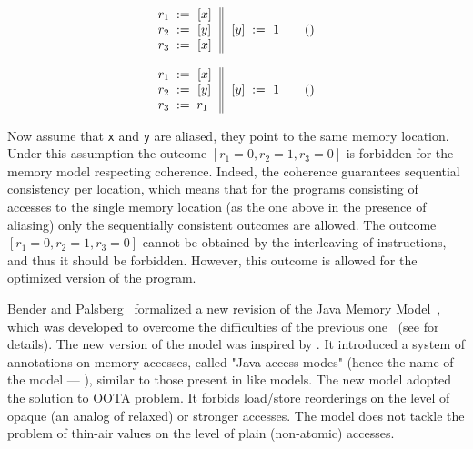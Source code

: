 \begin{minipage}{0.5\linewidth}
\begin{equation*}
\inarrII{
  \readInst{}{r_1}{x}      \\
  \readInst{}{r_2}{y}      \\
  \readInst{}{r_3}{x}      \\
}{
  \writeInst{}{y}{1}       \\
}
\tag{}\label{ex:coh-rr}
\end{equation*}
\end{minipage}
%
\begin{minipage}{0.5\linewidth}
\begin{equation*}
\inarrII{
  \readInst{}{r_1}{x}      \\
  \readInst{}{r_2}{y}      \\
  \assignInst{r_3}{r_1}    \\
}{
  \writeInst{}{y}{1}       \\
}
\tag{}\label{ex:coh-rr}
\end{equation*}
\end{minipage}

Now assume that \texttt{x} and \texttt{y} are aliased,
\ie they point to the same memory location.
Under this assumption the outcome $[r_1=0, r_2=1, r_3=0]$
is forbidden for the memory model respecting coherence.
Indeed, the coherence guarantees sequential consistency per location, 
which means that for the programs consisting of accesses 
to the single memory location 
(as the one above in the presence of aliasing) 
only the sequentially consistent outcomes are allowed.
The outcome $[r_1=0, r_2=1, r_3=0]$ cannot be obtained 
by the interleaving of instructions, and thus 
it should be forbidden.  
However, this outcome is allowed for 
the optimized version of the program. 

Bender and Palsberg~\cite{Bender-Palsberg:OOPSLA19} formalized a new revision 
of the Java Memory Model~\cite{JDK9-VarHandle, JEP:193, JDK9-Modes}, 
which was developed to overcome 
the difficulties of the previous one~\cite{Manson-al:POPL05}
(see \cite{sec:prm-cert} for details).
The new version of the model was inspired by \RCMM. 
It introduced a system of annotations on memory accesses, 
called "Java access modes" (hence the name of the model --- \JAM),
similar to those present in \CMM like models.
The new model adopted the \RCMM solution to OOTA problem. 
It forbids load/store reorderings on the level of 
opaque (an analog of \CPP relaxed) or stronger accesses.
The model does not tackle the problem of 
thin-air values on the level of plain (\ie non-atomic) accesses.

